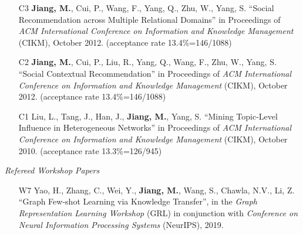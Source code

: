\documentclass[10pt]{article}
\newenvironment{myindentpar}[1]%
{\begin{list}{}%
         {\setlength{\leftmargin}{#1}}%
         \item[]%
}
{\end{list}}
\newcounter{list}
\begin{document}
\begin{myindentpar}{0.00cm}
\begin{enumerate}[leftmargin=.5cm]
\vspace{-0.1cm}

\item[C3] \textbf{Jiang, M.}, Cui, P., Wang, F., Yang, Q., Zhu, W., Yang, S. ``Social Recommendation across Multiple Relational Domains'' in Proceedings of \emph{ACM International Conference on Information and Knowledge Management} (CIKM), October 2012. (acceptance rate 13.4\%=146/1088)

\vspace{-0.1cm}

\item[C2] \textbf{Jiang, M.}, Cui, P., Liu, R., Yang, Q., Wang, F., Zhu, W., Yang, S. ``Social Contextual Recommendation'' in Proceedings of \emph{ACM International Conference on Information and Knowledge Management} (CIKM), October 2012. (acceptance rate 13.4\%=146/1088)

\vspace{-0.1cm}

\item[C1] Liu, L., Tang, J., Han, J., \textbf{Jiang, M.}, Yang, S. ``Mining Topic-Level Influence in Heterogeneous Networks'' in Proceedings of \emph{ACM International Conference on Information and Knowledge Management} (CIKM), October 2010. (acceptance rate 13.3\%=126/945)

\vspace{-0.1cm}

\end{enumerate}

\hspace{-0.25cm}\emph{Refereed Workshop Papers}

\begin{enumerate}[leftmargin=.5cm]

\item[W7] Yao, H., Zhang, C., Wei, Y., \textbf{Jiang, M.}, Wang, S., Chawla, N.V., Li, Z. ``Graph Few-shot Learning via Knowledge Transfer'', in the \textit{Graph Representation Learning Workshop} (GRL) in conjunction with \textit{Conference on Neural Information Processing Systems} (NeurIPS), 2019.
	

\end{enumerate}
\end{myindentpar}
\end{document}
